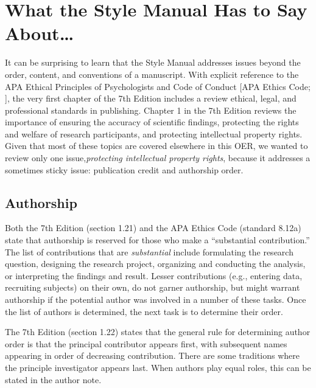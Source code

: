 \documentclass[
  11pt,
]{book}
\begin{document}
\hypertarget{what-the-style-manual--american_psychological_association_publication_2020-has-to-say-about}{%
\section{\texorpdfstring{What the Style Manual \citeyearpar{american_psychological_association_publication_2020} Has to Say About\ldots{}}{What the Style Manual {[}-@american\_psychological\_association\_publication\_2020{]} Has to Say About\ldots{}}}\label{what-the-style-manual--american_psychological_association_publication_2020-has-to-say-about}}

It can be surprising to learn that the Style Manual addresses issues beyond the order, content, and conventions of a manuscript. With explicit reference to the APA Ethical Principles of Psychologists and Code of Conduct {[}APA Ethics Code; \citet{american_psychological_association_ethical_2017}{]}, the very first chapter of the 7th Edition includes a review ethical, legal, and professional standards in publishing. Chapter 1 in the 7th Edition reviews the importance of ensuring the accuracy of scientific findings, protecting the rights and welfare of research participants, and protecting intellectual property rights. Given that most of these topics are covered elsewhere in this OER, we wanted to review only one issue,\emph{protecting intellectual property rights}, because it addresses a sometimes sticky issue: publication credit and authorship order.

\hypertarget{authorship}{%
\subsection{Authorship}\label{authorship}}

Both the 7th Edition (section 1.21) and the APA Ethics Code (standard 8.12a) state that authorship is reserved for those who make a ``substantial contribution.'' The list of contributions that are \emph{substantial} include formulating the research question, designing the research project, organizing and conducting the analysis, or interpreting the findings and result. Lesser contributions (e.g., entering data, recruiting subjects) on their own, do not garner authorship, but might warrant authorship if the potential author was involved in a number of these tasks. Once the list of authors is determined, the next task is to determine their order.

The 7th Edition (section 1.22) states that the general rule for determining author order is that the principal contributor appears first, with subsequent names appearing in order of decreasing contribution. There are some traditions where the principle investigator appears last. When authors play equal roles, this can be stated in the author note.
\end{document}

